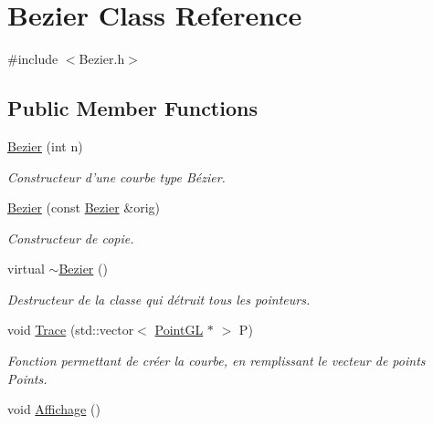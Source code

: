 \hypertarget{classBezier}{\section{Bezier Class Reference}
\label{classBezier}
}


{\ttfamily \#include $<$Bezier.\-h$>$}

\subsection*{Public Member Functions}
\begin{DoxyCompactItemize}
\item 
\hyperlink{classBezier_a4a7be5dfa4ae95eb978123b256681c59}{Bezier} (int n)
\begin{DoxyCompactList}\small\item\em Constructeur d'une courbe type Bézier. \end{DoxyCompactList}\item 
\hypertarget{classBezier_a042d3cca85d534451938671d5d7a7383}{\hyperlink{classBezier_a042d3cca85d534451938671d5d7a7383}{Bezier} (const \hyperlink{classBezier}{Bezier} \&orig)}\label{classBezier_a042d3cca85d534451938671d5d7a7383}

\begin{DoxyCompactList}\small\item\em Constructeur de copie. \end{DoxyCompactList}\item 
\hypertarget{classBezier_a32f81ea72bd31a4607b4168839ea8815}{virtual \hyperlink{classBezier_a32f81ea72bd31a4607b4168839ea8815}{$\sim$\-Bezier} ()}\label{classBezier_a32f81ea72bd31a4607b4168839ea8815}

\begin{DoxyCompactList}\small\item\em Destructeur de la classe qui détruit tous les pointeurs. \end{DoxyCompactList}\item 
void \hyperlink{classBezier_a3973f77432e3a02a7971d6a524668aef}{Trace} (std\-::vector$<$ \hyperlink{classPointGL}{Point\-G\-L} $\ast$ $>$ P)
\begin{DoxyCompactList}\small\item\em Fonction permettant de créer la courbe, en remplissant le vecteur de points Points. \end{DoxyCompactList}\item 
\hypertarget{classBezier_a66d2cf118a768281f51ee743774b184c}{void \hyperlink{classBezier_a66d2cf118a768281f51ee743774b184c}{Affichage} ()}\label{classBezier_a66d2cf118a768281f51ee743774b184c}


\end{DoxyCompactItemize}
